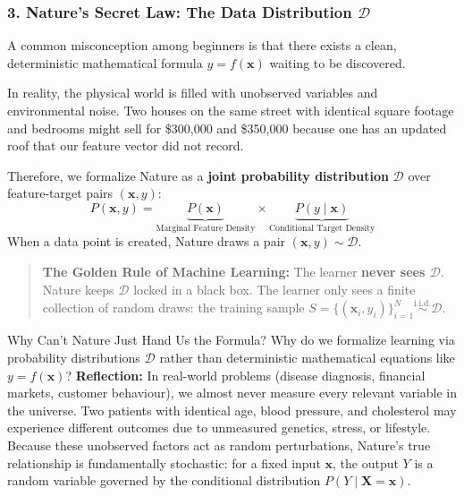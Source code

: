 \subsubsection{3. Nature's Secret Law: The Data Distribution $\mathcal{D}$}
A common misconception among beginners is that there exists a clean, deterministic mathematical formula $y = f(\mathbf{x})$ waiting to be discovered.

In reality, the physical world is filled with unobserved variables and environmental noise. Two houses on the same street with identical square footage and bedrooms might sell for \$300,000 and \$350,000 because one has an updated roof that our feature vector did not record.

Therefore, we formalize Nature as a \textbf{joint probability distribution} $\mathcal{D}$ over feature-target pairs $(\mathbf{x}, y)$:
\begin{equation}
P(\mathbf{x}, y) = \underbrace{P(\mathbf{x})}_{\text{Marginal Feature Density}} \times \underbrace{P(y \mid \mathbf{x})}_{\text{Conditional Target Density}}
\end{equation}
When a data point is created, Nature draws a pair $(\mathbf{x}, y) \sim \mathcal{D}$.
\begin{quote}
\textbf{The Golden Rule of Machine Learning:} The learner \textbf{never sees $\mathcal{D}$}. Nature keeps $\mathcal{D}$ locked in a black box. The learner only sees a finite collection of random draws: the training sample $S = \{(\mathbf{x}_i, y_i)\}_{i=1}^N \stackrel{\text{i.i.d.}}{\sim} \mathcal{D}$.
\end{quote}

\begin{ponderbox}{Why Can't Nature Just Hand Us the Formula?}
Why do we formalize learning via probability distributions $\mathcal{D}$ rather than deterministic mathematical equations like $y = f(\mathbf{x})$?
\tcblower
\textbf{Reflection:} In real-world problems (disease diagnosis, financial markets, customer behaviour), we almost never measure every relevant variable in the universe. Two patients with identical age, blood pressure, and cholesterol may experience different outcomes due to unmeasured genetics, stress, or lifestyle. Because these unobserved factors act as random perturbations, Nature's true relationship is fundamentally stochastic: for a fixed input $\mathbf{x}$, the output $Y$ is a random variable governed by the conditional distribution $P(Y \mid \mathbf{X} = \mathbf{x})$.
\end{ponderbox}

